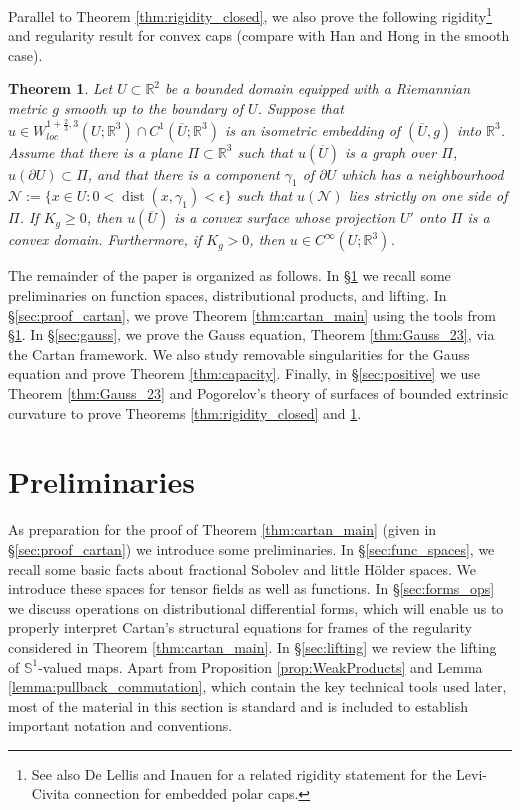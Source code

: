 \documentclass[12pt]{article}
\newcommand{\R}{\mathbb{R}}
\newcommand{\dist}{\operatorname{dist}}
\theoremstyle{plain}
\newtheorem{theorem}{Theorem}[section]
\numberwithin{equation}{section}
\begin{document}
Parallel to Theorem \ref{thm:rigidity_closed}, we also prove the following rigidity\footnote{See also De Lellis and Inauen \cite{deLellis_inauen_20} for a related rigidity statement for the Levi-Civita connection for embedded polar caps.} and regularity result for convex caps (compare with Han and Hong \cite[Theorem 8.1.7]{han_hong_06} in the smooth case). 
\begin{theorem} \label{thm:rigidity_caps}
     Let $U \subset \R^2$ be a bounded domain equipped with a Riemannian metric $g$ smooth up to the boundary of $U$. Suppose that $u \in W^{1+\frac23,3}_{loc}(U;\R^3) \cap C^1(\overline U;\R^3)$ is an isometric embedding of $(\overline U, g)$ into $\R^3$. Assume that there is a plane $\Pi \subset \R^3$ such that $u(\overline U)$ is a graph over $\Pi$, $u(\partial U) \subset \Pi$, and that there is a component $\gamma_1$ of $\partial U$ which has a neighbourhood $\mathcal{N} := \{x \in U : 0 < \dist(x,\gamma_1) < \epsilon\}$ such that $u(\mathcal{N})$ lies strictly on one side of $\Pi$. If $K_g \geq 0$, then $u(\overline U)$ is a convex surface whose projection $U'$ onto $\Pi$ is a convex domain. Furthermore, if $K_g > 0$, then $u \in C^\infty(U;\R^3)$.
\end{theorem}

The remainder of the paper is organized as follows. In \S\ref{sec:prelims} we recall some preliminaries on function spaces, distributional products, and lifting. In \S\ref{sec:proof_cartan}, we prove Theorem \ref{thm:cartan_main} using the tools from \S\ref{sec:prelims}. In \S\ref{sec:gauss}, we prove the Gauss equation, Theorem \ref{thm:Gauss_23}, via the Cartan framework. We also study removable singularities for the Gauss equation and prove Theorem \ref{thm:capacity}. Finally, in \S\ref{sec:positive} we use Theorem \ref{thm:Gauss_23} and Pogorelov's theory of surfaces of bounded extrinsic curvature to prove Theorems \ref{thm:rigidity_closed} and \ref{thm:rigidity_caps}. 



\section{Preliminaries} \label{sec:prelims}
    As preparation for the proof of Theorem \ref{thm:cartan_main} (given in \S \ref{sec:proof_cartan}) we introduce some preliminaries. In \S \ref{sec:func_spaces}, we recall some basic facts about fractional Sobolev and little Hölder spaces. We introduce these spaces for tensor fields as well as functions. In \S \ref{sec:forms_ops} we discuss operations on distributional differential forms, which will enable us to properly interpret Cartan's structural equations for frames of the regularity considered in Theorem \ref{thm:cartan_main}. In \S \ref{sec:lifting} we review the lifting of $\mathbb{S}^1$-valued maps. Apart from Proposition \ref{prop:WeakProducts} and Lemma \ref{lemma:pullback_commutation}, which contain the key technical tools used later, most of the material in this section is standard and is included to establish important notation and conventions. 
    
\end{document}

